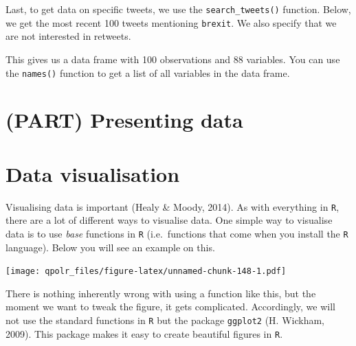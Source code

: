 \documentclass[12pt,oneside]{reedthesis}
\theoremstyle{definition}
\theoremstyle{definition}
\theoremstyle{definition}
\theoremstyle{remark}
\begin{document}
  Last, to get data on specific tweets, we use the
  \texttt{search\_tweets()} function. Below, we get the most recent 100
  tweets mentioning \texttt{brexit}. We also specify that we are not
  interested in retweets.
  \begin{Shaded}
  \begin{Highlighting}[]
  \StringTok{ }\NormalTok{(}
    \NormalTok{, } \NormalTok{, } 
  \NormalTok{)}
  \end{Highlighting}
  \end{Shaded}
  This gives us a data frame with 100 observations and 88 variables. You
  can use the \texttt{names()} function to get a list of all variables in
  the data frame.
  
  \chapter*{(PART) Presenting data}\label{part-presenting-data}
  
  \chapter{Data visualisation}\label{dataviz}
  
  Visualising data is important (Healy \& Moody, 2014). As with everything
  in \texttt{R}, there are a lot of different ways to visualise data. One
  simple way to visualise data is to use \emph{base} functions in
  \texttt{R} (i.e.~functions that come when you install the \texttt{R}
  language). Below you will see an example on this.
  \begin{Shaded}
  \begin{Highlighting}[]
  \NormalTok{(}\OperatorTok{$}\OperatorTok{$}
  \end{Highlighting}
  \end{Shaded}
  \texttt{[image: qpolr\_files/figure-latex/unnamed-chunk-148-1.pdf]}
  
  There is nothing inherently wrong with using a function like this, but
  the moment we want to tweak the figure, it gets complicated.
  Accordingly, we will not use the standard functions in \texttt{R} but
  the package \texttt{ggplot2} (H. Wickham, 2009). This package makes it
  easy to create beautiful figures in \texttt{R}.
  
\end{document}
